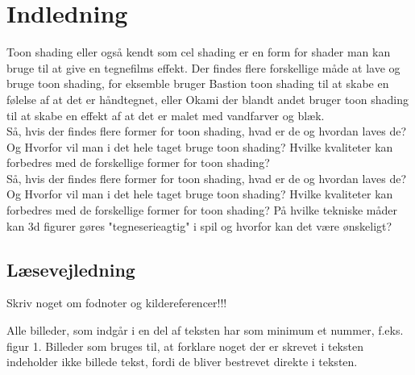 \section*{Indledning}
\thispagestyle{empty}
Toon shading eller også kendt som cel shading er en form for shader man kan bruge til at give en tegnefilms effekt. Der findes flere forskellige måde at lave og bruge toon shading, for eksemble bruger Bastion toon shading til at skabe en følelse af at det er håndtegnet, eller Okami der blandt andet bruger toon shading til at skabe en effekt af at det er malet med vandfarver og blæk.
\\
Så, hvis der findes flere former for toon shading, hvad er de og hvordan laves de? Og Hvorfor vil man i det hele taget bruge toon shading? Hvilke kvaliteter kan forbedres med de forskellige former for toon shading?
\\
Så, hvis der findes flere former for toon shading, hvad er de og hvordan laves de? Og Hvorfor vil man i det hele taget bruge toon shading? Hvilke kvaliteter kan forbedres med de forskellige former for toon shading?
På hvilke tekniske måder kan 3d figurer gøres "tegneserieagtig"
i spil og hvorfor kan det være ønskeligt?

\subsection*{Læsevejledning}
Skriv noget om fodnoter og kildereferencer!!!

Alle billeder, som indgår i en del af teksten har som minimum et nummer, f.eks. figur 1. Billeder som bruges til, at forklare noget der er skrevet i teksten indeholder ikke billede tekst, fordi de bliver bestrevet direkte i teksten. 

